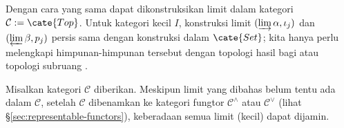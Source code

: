 \begin{example}\label{eg:top-limits}
	Dengan cara yang sama dapat dikonstruksikan limit dalam kategori $\mathcal{C} := \cate{Top}$. Untuk kategori kecil $I$, konstruksi limit $(\varinjlim \alpha, \iota_j)$ dan $(\varprojlim \beta, p_j)$ persis sama dengan konstruksi dalam $\cate{Set}$; kita hanya perlu melengkapi himpunan-himpunan tersebut dengan topologi hasil bagi atau topologi subruang \cite[\S 3.1, \S 3.4]{Xiong}.
\end{example}

Misalkan kategori $\mathcal{C}$ diberikan. Meskipun limit yang dibahas belum tentu ada dalam $\mathcal{C}$, setelah $\mathcal{C}$ dibenamkan ke kategori fungtor $\mathcal{C}^\wedge$ atau $\mathcal{C}^\vee$ (lihat \S\ref{sec:representable-functors}), keberadaan semua limit (kecil) dapat dijamin.

